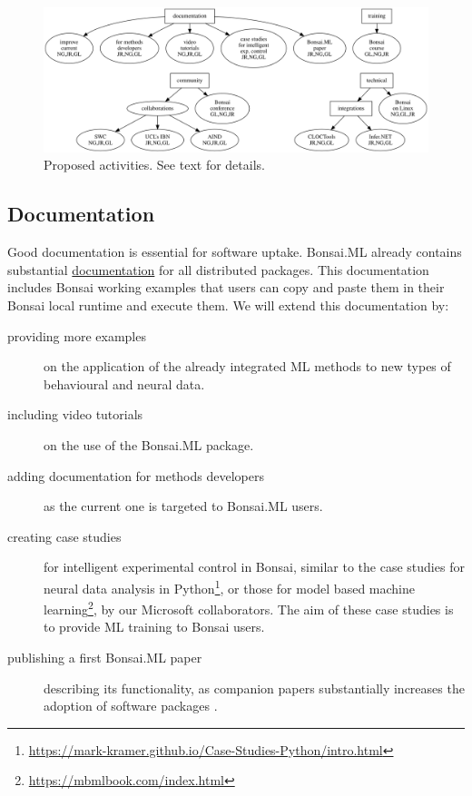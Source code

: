 
\begin{figure}
    \centering
    \includegraphics[width=6in]{activitiesGraphs/activities_larger.png}
    \caption{Proposed activities. See text for details.}
\end{figure}

\subsection*{Documentation}

Good documentation is essential for software uptake.
%
Bonsai.ML already contains substantial
\href{https://bonsai-rx.org/machinelearning/index.html}{documentation} for all
distributed packages. This documentation includes Bonsai working examples that users
can copy and paste them in their Bonsai local runtime and execute them. We will
extend this documentation by:

\begin{description}

    \item[providing more examples] on the application of the
        already integrated ML methods to new types of behavioural and
        neural data.

    \item[including video tutorials] on the use of the Bonsai.ML
        package.

    \item[adding documentation for methods developers] as the current one is
        targeted to Bonsai.ML users.

    \item[creating case studies] for intelligent experimental control in Bonsai,
        similar to the case studies for neural data analysis in
        Python\footnote[4]{\url{https://mark-kramer.github.io/Case-Studies-Python/intro.html}},
        or those for model based machine
        learning\footnote[5]{\url{https://mbmlbook.com/index.html}}, by our Microsoft
        collaborators.
        The aim of these case studies is to provide ML training to
        Bonsai users.

    \item[publishing a first Bonsai.ML paper] describing its functionality, as
        companion papers substantially increases the adoption of software
        packages \citep{lopesEtAl15,guilbeaultEtAl21}.

\end{description}

